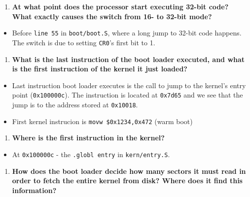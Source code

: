 \documentclass[]{article}
\begin{document}
\begin{enumerate}
\def\labelenumi{\arabic{enumi}.}
\itemsep1pt\parskip0pt
\item
  \textbf{At what point does the processor start executing 32-bit code?
  What exactly causes the switch from 16- to 32-bit mode?}
\end{enumerate}

\begin{itemize}
\itemsep1pt\parskip0pt
\item
  Before \texttt{line 55} in \texttt{boot/boot.S}, where a long jump to
  32-bit code happens. The switch is due to setting \texttt{CR0}'s first
  bit to 1.
\end{itemize}

\begin{enumerate}
\def\labelenumi{\arabic{enumi}.}
\setcounter{enumi}{1}
\itemsep1pt\parskip0pt
\item
  \textbf{What is the last instruction of the boot loader executed, and
  what is the first instruction of the kernel it just loaded?}
\end{enumerate}

\begin{itemize}
\itemsep1pt\parskip0pt
\item
  Last instruction boot loader executes is the call to jump to the
  kernel's entry point (\texttt{0x100000c}). The instruction is located
  at \texttt{0x7d65} and we see that the jump is to the address stored
  at \texttt{0x10018}.
\item
  First kernel instrucion is \texttt{movw \$0x1234,0x472} (warm boot)
\end{itemize}

\begin{enumerate}
\def\labelenumi{\arabic{enumi}.}
\setcounter{enumi}{2}
\itemsep1pt\parskip0pt
\item
  \textbf{Where is the first instruction in the kernel?}
\end{enumerate}

\begin{itemize}
\itemsep1pt\parskip0pt
\item
  At \texttt{0x100000c} - the \texttt{.globl entry} in
  \texttt{kern/entry.S}.
\end{itemize}

\begin{enumerate}
\def\labelenumi{\arabic{enumi}.}
\setcounter{enumi}{3}
\itemsep1pt\parskip0pt
\item
  \textbf{How does the boot loader decide how many sectors it must read
  in order to fetch the entire kernel from disk? Where does it find this
  information?}
\end{enumerate}
\end{document}
